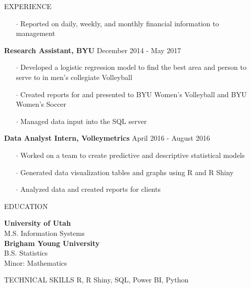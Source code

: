 \documentclass{resume} %
\begin{document}
\begin{rSection}{EXPERIENCE}
\begin{itemize}[noitemsep]
      \item[$\cdot$] Reported on daily, weekly, and monthly ﬁnancial information to management
    \end{itemize}
    {\bf Research Assistant, BYU} \hfill {December 2014 - May 2017}
        \begin{itemize}[noitemsep]
      \item[$\cdot$] Developed a logistic regression model to find the best area and person to serve to in men's collegiate Volleyball
      \item[$\cdot$] Created reports for and presented to BYU Women's Volleyball and BYU Women's Soccer 
      \item[$\cdot$] Managed data input into the SQL server
    \end{itemize}
    {\bf Data Analyst Intern, Volleymetrics} \hfill {April 2016 - August 2016}
    \begin{itemize}[noitemsep]
    \item[$\cdot$] Worked on a team to create predictive and descriptive statistical models
    \item[$\cdot$] Generated data visualization tables and graphs using R and R Shiny
    \item[$\cdot$] Analyzed data and created reports for clients
    \end{itemize}
    
     \end{rSection}
      
      \begin{rSection}{EDUCATION}
    
    {\bf University of Utah} 
    \\ M.S. Information Systems\hfill \break
    \\{\bf Brigham Young University} 
    \\ B.S. Statistics
    \\ Minor: Mathematics \hfill \break
    \end{rSection}
    
      
      \begin{rSection}{TECHNICAL SKILLS}
   R, R Shiny, SQL, Power BI, Python
    \end{rSection}

    
\end{document}
